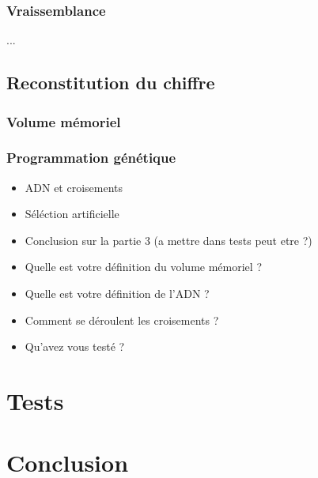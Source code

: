 \documentclass[a4paper, 11pt]{article}
\begin{document}
\subsubsection{Vraissemblance}
...

\subsection{Reconstitution du chiffre}

\subsubsection{Volume mémoriel}
\subsubsection{Programmation génétique}
\begin{itemize}
\item ADN et croisements
\item Séléction artificielle
\item Conclusion sur la partie 3 (a mettre dans tests peut etre ?)
\end{itemize}

\begin{itemize}
\item Quelle est votre définition du volume mémoriel ?
\item Quelle est votre définition de l'ADN ?
\item Comment se déroulent les croisements ?
\item Qu'avez vous testé ?
\end{itemize}


\section{Tests}

\section{Conclusion}
\end{document}
